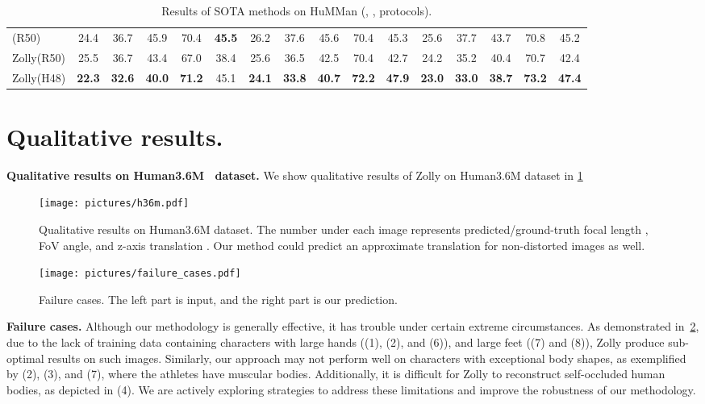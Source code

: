 \documentclass[10pt,twocolumn,letterpaper]{article}
\def\Ours{{Zolly}\xspace}
\begin{document}
{\begin{table*}[h]
{\begin{tabular}{lccccc|ccccc|ccccc}
\midrule
\rule{0pt}{10pt}  (R50)  &  24.4 & 36.7 & 45.9 & 70.4 & \textbf{45.5} & 26.2 & 37.6 & 45.6 & 70.4 & 45.3 & 25.6 & 37.7 & 43.7 & 70.8 & 45.2 \\
\rule{0pt}{10pt} \Ours (R50)  &  25.5 & 36.7 & 43.4 & 67.0 & 38.4 & 25.6 & 36.5 & 42.5 & 70.4 & 42.7 & 24.2 & 35.2 & 40.4 & 70.7 & 42.4 \\
\rule{0pt}{10pt} \Ours (H48)  & \textbf{22.3} & \textbf{32.6} & \textbf{40.0} & \textbf{71.2} & 45.1 & \textbf{24.1} & \textbf{33.8} & \textbf{40.7} & \textbf{72.2} & \textbf{47.9} & \textbf{23.0} & \textbf{33.0} & \textbf{38.7} & \textbf{73.2} & \textbf{47.4}    \\
\bottomrule
\end{tabular}
 }
    
    \caption{Results of SOTA methods on HuMMan (, ,  protocols).}
    \label{tab:sota_sup_humman}
\end{table*}

\section{Qualitative results.}



\noindent\textbf{Qualitative results on Human3.6M~\cite{h36m} dataset.}
We show qualitative results of \Ours on Human3.6M dataset in \cref{fig:h36m}
\begin{figure}[ht]
    \centering
    \texttt{[image: pictures/h36m.pdf]}
    \caption{Qualitative results on Human3.6M dataset. The number under each image represents predicted/ground-truth focal length , FoV angle, and z-axis translation . Our method could predict an approximate translation for non-distorted images as well.}
    \label{fig:h36m}
    \vspace{-10pt}
\end{figure}



\begin{figure}[h]
    \centering
    \texttt{[image: pictures/failure\_cases.pdf]}
    \caption{Failure cases. The left part is input, and the right part is our prediction.}
    \label{fig:failure}
    \vspace{-10pt}
\end{figure}

\noindent\textbf{Failure cases.}
Although our methodology is generally effective, it has trouble under certain extreme circumstances. As demonstrated in~\cref{fig:failure}, due to the lack of training data containing characters with large hands ((1), (2), and (6)), and large feet ((7) and (8)), \Ours produce sub-optimal results on such images. 
Similarly, our approach may not perform well on characters with exceptional body shapes, as exemplified by (2), (3), and (7), where the athletes have muscular bodies. Additionally, it is difficult for \Ours to reconstruct self-occluded human bodies, as depicted in (4). We are actively exploring strategies to address these limitations and improve the robustness of our methodology.

}
\end{document}
